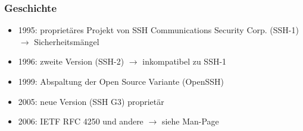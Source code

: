 \begin{frame}
\frametitle{Geschichte}
\begin{itemize}
\item 1995: proprietäres Projekt von SSH Communications Security Corp. (SSH-1) $\rightarrow$ Sicherheitsmängel
\pause
\item 1996: zweite Version (SSH-2) $\rightarrow$ inkompatibel zu SSH-1
\pause
\item 1999: Abspaltung der Open Source Variante (OpenSSH)
\pause
\item 2005: neue Version (SSH G3) proprietär
\pause
\item 2006: IETF RFC 4250 und andere $\rightarrow$ siehe Man-Page
\end{itemize}
\end{frame}